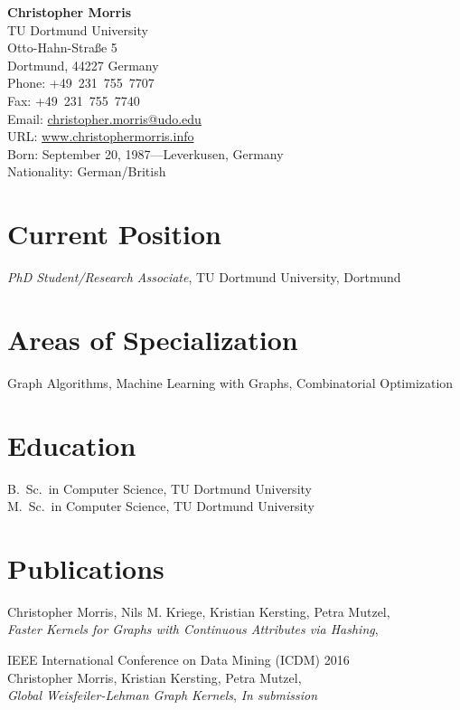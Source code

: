 \documentclass[11pt, a4paper]{scrartcl}
\newcommand{\years}[1]{\marginnote {\bf #1}}
\begin{document}
{\LARGE \bf Christopher Morris}\\[1cm] 
TU Dortmund University\\ 
Otto-Hahn-Stra\ss{}e 5\\
Dortmund, 44227
Germany\\[.2cm]
Phone: +49\ 231~755~7707\\ 
Fax: +49~231~755~7740\\[.2cm] 
Email: \href{mailto:christopher.morris@udo.edu}{christopher.morris@udo.edu}\\
URL: \href{www.christophermorris.info}{www.christophermorris.info}\\ 

Born: September 20, 1987---Leverkusen, Germany\\ 
Nationality: German/British 

\section*{Current Position}
\emph{PhD Student/Research Associate}, TU Dortmund University, Dortmund %

\section*{Areas of Specialization}
Graph Algorithms, Machine Learning with Graphs, Combinatorial Optimization

\section*{Education}
\years{2012} B.~Sc.~in Computer Science, TU Dortmund University\\
\years{2015} M.~Sc.~in Computer Science, TU Dortmund University

\section*{Publications}

\years{2016} Christopher Morris, Nils M. Kriege, Kristian Kersting, Petra Mutzel, \\
\emph{Faster Kernels for Graphs with Continuous Attributes via Hashing},

IEEE International Conference on Data Mining (ICDM) 2016\\

\years{2017} Christopher Morris, Kristian Kersting, Petra Mutzel, \\
\emph{Global Weisfeiler-Lehman Graph Kernels},
\emph{In submission}\\
\end{document}
